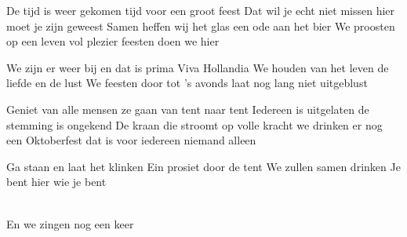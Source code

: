 \begin{verse*}
De tijd is weer gekomen
tijd voor een groot feest
Dat wil je echt niet missen
hier moet je zijn geweest
Samen heffen wij het glas
een ode aan het bier
We proosten op een leven vol plezier
feesten doen we hier
\end{verse*}

\begin{chorus}
We zijn er weer bij
en dat is prima
Viva Hollandia
We houden van het leven
de liefde en de lust
We feesten door tot 's avonds laat
nog lang niet uitgeblust
\end{chorus}

\begin{verse*}
Geniet van alle mensen
ze gaan van tent naar tent
Iedereen is uitgelaten
de stemming is ongekend
De kraan die stroomt op volle kracht
we drinken er nog een
Oktoberfest dat is voor iedereen
niemand alleen
\end{verse*}

\thechorus[2]

\begin{bridge}
Ga staan en laat het klinken
Ein prosiet door de tent
We zullen samen drinken
Je bent hier wie je bent
\end{bridge}

\\
En we zingen nog een keer

\thechorus[3]
